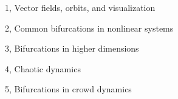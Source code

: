 \documentclass[10pt,a4paper]{article}
\begin{document}
\frontpage

\begin{task}{1, Vector fields, orbits, and visualization}

\end{task}

\begin{task}{2, Common bifurcations in nonlinear systems}

\end{task}

\newpage
\begin{task}{3, Bifurcations in higher dimensions}

\end{task}

\begin{task}{4, Chaotic dynamics}

\end{task}

\begin{task}{5, Bifurcations in crowd dynamics}

\end{task}



\end{document}
